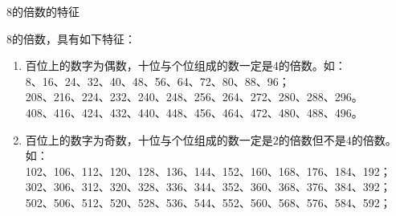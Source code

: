 \documentclass[aspectratio=169]{ctexbeamer} %
\date{\today}
\begin{document}
\begin{frame}[t]{8的倍数的特征}
\begin{spacing}{1.2}
\normalsize
8的倍数，具有如下特征：
\begin{enumerate}[label={\arabic*.}]
\item \alert{百位上的数字为偶数，十位与个位组成的数一定是4的倍数。如：} \\
8、16、24、32、40、48、56、64、72、80、88、96；\\
208、216、224、232、240、248、256、264、272、280、288、296。 \\
408、416、424、432、440、448、456、464、472、480、488、496。 
\item \alert{百位上的数字为奇数，十位与个位组成的数一定是2的倍数但不是4的倍数。如：} \\
102、106、112、120、128、136、144、152、160、168、176、184、192；\\
302、306、312、320、328、336、344、352、360、368、376、384、392；\\
502、506、512、520、528、536、544、552、560、568、576、584、592；
\end{enumerate}

\end{spacing}
\end{frame}
\end{document}
